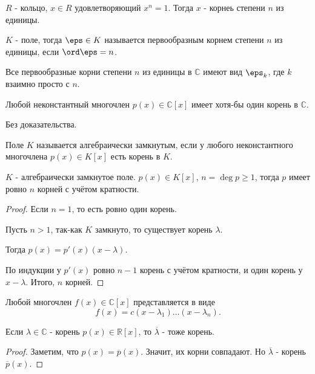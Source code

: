 \begin{definition} 
    $R$ - кольцо, $x\in R$ удовлетворяющий $x^{n} = 1$. Тогда $x$ - корнеь степени $n$ из единицы.
\end{definition}
\begin{definition} 
    $K$ - поле, тогда $\eps\in K$ называется первообразным корнем степени $n$ из единицы, если $\ord \eps = n$.
\end{definition}
\begin{remark} 
    Все первообразные корни степени $n$ из единицы в $\mathbb{C}$ имеют вид $\eps_k$, где $k$ взаимно просто с $n$.
\end{remark}
\begin{theorem} 
    Любой неконстантный многочлен $p(x)\in \mathbb{C}[x]$ имеет хотя-бы один корень в $\mathbb{C}$.

    Без доказательства.
\end{theorem}
\begin{definition} 
    Поле $K$ называется алгебраически замкнутым, если у любого неконстантного многочлена $p(x)\in K[x]$ есть корень в $K$.
\end{definition}
\begin{lemma} 
    $K$ - алгебраически замкнутое поле. $p(x)\in K[x]$, $n=\deg p \ge 1$, тогда $p$ имеет ровно  $n$ корней с учётом кратности.
    \begin{proof}
        Если $n=1$, то есть ровно один корень.

        Пусть $n>1$, так-как $K$ замкнуто, то существует корень $\lambda$.

        Тогда $p(x) = p'(x)(x-\lambda)$.

        По индукции у $p'(x)$ ровно $n-1$ корень с учётом кратности, и один корень у $x-\lambda$. Итого, $n$ корней.
    \end{proof}
\end{lemma}
\begin{remark} 
    Любой многочлен $f(x)\in \mathbb{C}[x]$ представляется в виде
    \[ f(x) = c(x-\lambda_1)\ldots\left( x-\lambda_n \right)  .\] 
\end{remark}
\begin{lemma} 
    Если $\lambda\in \mathbb{C}$ - корень $p(x)\in \mathbb{R}[x]$, то $\overline{\lambda}$ - тоже корень.
    \begin{proof}
        Заметим, что $p(x) = \overline{p}(x)$. Значит, их корни совпадают. Но $\overline{\lambda}$ - корень $\overline{p}(x)$.
    \end{proof}
\end{lemma}
